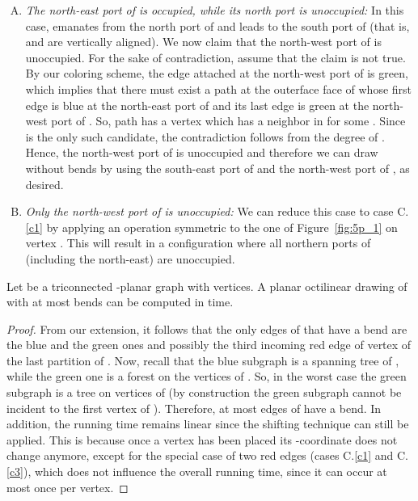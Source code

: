 \documentclass[a4paper,twoside,11pt]{article}
\begin{document}
\begin{enumerate}[C.1:]
\item \label{c2} \emph{The north-east port of  is occupied,
while its north port is unoccupied:} In this case,  emanates from
the north port of  and leads to the south port of  (that
is,  and  are vertically aligned). We now claim that the
north-west port of  is unoccupied. For the sake of
contradiction, assume that the claim is not true. By our coloring
scheme, the edge attached at the north-west port of  is
green, which implies that there must exist a path  at the outerface face of  whose
first edge is blue at the north-east port of  and its last edge
is green at the north-west port of .
So, path  has a vertex which has a
neighbor in  for some . Since  is the
only such candidate, the contradiction follows from the degree of
. Hence, the north-west port of  is unoccupied and
therefore we can draw  without bends by using the south-east
port of  and the north-west port of , as desired.


\item \label{c3} \emph{Only the north-west port of  is
unoccupied:} We can reduce this case to case C.\ref{c1} by applying
an operation symmetric to the one of Figure~\ref{fig:5p_1}  on vertex
. This will result in a configuration where all northern ports
of  (including the north-east) are unoccupied.
\end{enumerate}

\begin{theorem}
Let  be a triconnected -planar graph with  vertices. A
planar octilinear drawing  of  with at most 
bends can be computed in  time.
\label{thm:5ub}
\end{theorem}
\begin{proof}
From our extension, it follows that the only edges of 
that have a bend are the blue and the green ones and possibly the
third incoming red edge of vertex  of the last partition 
of . Now, recall that the blue subgraph is a spanning tree of
, while the green one is a forest on the vertices of . So, in
the worst case the green subgraph is a tree on  vertices of 
(by construction the green subgraph cannot be incident to the first
vertex  of ). Therefore, at most  edges of
 have a bend.  In addition, the running time remains
linear since the shifting technique can still be applied. This is
because once a vertex has been placed its -coordinate does not
change anymore, except for the special case of two red edges (cases
C.\ref{c1} and C.\ref{c3}), which does not influence the overall
running time, since it can occur at most once per vertex.
\end{proof}
\end{document}
